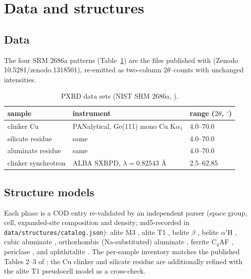 \documentclass[11pt,a4paper]{article}
\begin{document}
\section{Data and structures}
\subsection{Data}
The four SRM 2686a patterns (Table~\ref{tab:data}) are the files
published with \cite{garcia-mate2024srms} (Zenodo
10.5281/zenodo.1318501), re-emitted as two-column 2$\theta$--counts
with unchanged intensities.
\begin{table}[ht]
\centering
\small
\begin{tabular}{@{}lll@{}}
\toprule
sample & instrument & range ($2\theta$, $^\circ$) \\
\midrule
clinker Cu & PANalytical, Ge(111) mono Cu K$\alpha_1$ & 4.0--70.0 \\
silicate residue & same & 4.0--70.0 \\
aluminate residue & same & 4.0--70.0 \\
clinker synchrotron & ALBA SXRPD, $\lambda = 0.82543$ \AA & 2.5--62.85 \\
\bottomrule
\end{tabular}
\caption{PXRD data sets (NIST SRM 2686a, \cite{garcia-mate2024srms}).}
\label{tab:data}
\end{table}

\subsection{Structure models}
Each phase is a COD entry re-validated by an independent parser (space
group, cell, expanded-site composition and density; md5-recorded in
\texttt{data/structures/catalog.json}):
alite M3 \cite{nishi1985alite}, alite T1 \cite{delatorre2002t1},
belite $\beta$ \cite{tsurumi1994belite}, belite $\alpha'$H
\cite{mumme1996alphah}, cubic aluminate \cite{mondal1975c3a},
orthorhombic (Na-substituted) aluminate \cite{takeuchi1980c3ana},
ferrite C$_4$AF \cite{colville1972c4af}, periclase
\cite{sasaki1979periclase}, and aphthitalite \cite{okada1980aphthitalite}.
The per-sample inventory matches the published Tables 2--3 of
\cite{garcia-mate2024srms}; the Cu clinker and silicate residue are
additionally refined with the alite T1 pseudocell model as a
cross-check.
\end{document}

